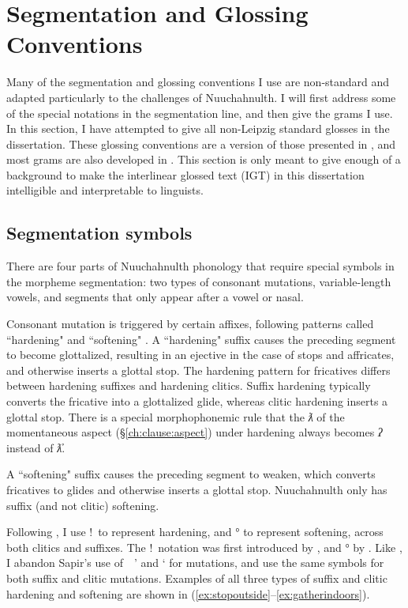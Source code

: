 \chapter{Segmentation and Glossing Conventions} \label{appendix:glossing}

Many of the segmentation and glossing conventions I use are non-standard and adapted particularly to the challenges of Nuuchahnulth. I will first address some of the special notations in the segmentation line, and then give the grams I use. In this section, I have attempted to give all non-Leipzig standard \citep{leipzig} glosses in the dissertation. These glossing conventions are a version of those presented in \citet{inmanwerle2016a}, and most grams are also developed in \citet{werle2016}. This section is only meant to give enough of a background to make the interlinear glossed text (IGT) in this dissertation intelligible and interpretable to linguists.

\section{Segmentation symbols}

There are four parts of Nuuchahnulth phonology that require special symbols in the morpheme segmentation: two types of consonant mutations, variable-length vowels, and segments that only appear after a vowel or nasal.

Consonant mutation is triggered by certain affixes, following patterns called ``hardening" and ``softening" \citep{werle2010}. A ``hardening" suffix causes the preceding segment to become glottalized, resulting in an ejective in the case of stops and affricates, and otherwise inserts a glottal stop. The hardening pattern for fricatives differs between hardening suffixes and hardening clitics. Suffix hardening typically converts the fricative into a glottalized glide, whereas clitic hardening inserts a glottal stop. There is a special morphophonemic rule that the \textit{ƛ} of the momentaneous aspect (\S\ref{ch:clause:aspect}) under hardening always becomes \textit{ʔ} instead of \textit{ƛ̓}.

A ``softening" suffix causes the preceding segment to weaken, which converts fricatives to glides and otherwise inserts a glottal stop. Nuuchahnulth only has suffix (and not clitic) softening.

Following \citet{werle2010}, I use !\ to represent hardening, and ° to represent softening, across both clitics and suffixes. The !\ notation was first introduced by \citet{boas1900}, and ° by \citet{jacobsen1973}. Like \citeauthor{werle2010}, I abandon Sapir's use of\ \ ' and ` for mutations, and use the same symbols for both suffix and clitic mutations. Examples of all three types of suffix and clitic hardening and softening are shown in (\ref{ex:stopoutside}--\ref{ex:gatherindoors}).

